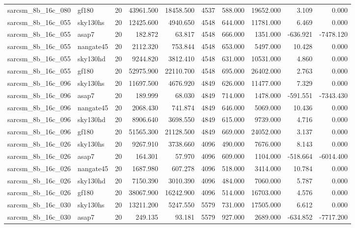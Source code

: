 \begin{tabular}{llrrrrrrrr}
sarcsm\_8b\_16c\_080 & gf180 & 20 & 43961.500 & 18458.500 & 4537 & 588.000 & 19652.000 & 3.109 & 0.000 \\
sarcsm\_8b\_16c\_055 & sky130hs & 20 & 12425.600 & 4940.650 & 4548 & 644.000 & 11781.000 & 6.469 & 0.000 \\
sarcsm\_8b\_16c\_055 & asap7 & 20 & 182.872 & 63.817 & 4548 & 666.000 & 1351.000 & -636.921 & -7478.120 \\
sarcsm\_8b\_16c\_055 & nangate45 & 20 & 2112.320 & 753.844 & 4548 & 653.000 & 5497.000 & 10.428 & 0.000 \\
sarcsm\_8b\_16c\_055 & sky130hd & 20 & 9244.820 & 3812.410 & 4548 & 631.000 & 10531.000 & 4.860 & 0.000 \\
sarcsm\_8b\_16c\_055 & gf180 & 20 & 52975.900 & 22110.700 & 4548 & 695.000 & 26402.000 & 2.763 & 0.000 \\
sarcsm\_8b\_16c\_096 & sky130hs & 20 & 11697.500 & 4676.920 & 4849 & 626.000 & 11477.000 & 7.329 & 0.000 \\
sarcsm\_8b\_16c\_096 & asap7 & 20 & 189.999 & 68.030 & 4849 & 714.000 & 1478.000 & -591.551 & -7343.430 \\
sarcsm\_8b\_16c\_096 & nangate45 & 20 & 2068.430 & 741.874 & 4849 & 646.000 & 5069.000 & 10.436 & 0.000 \\
sarcsm\_8b\_16c\_096 & sky130hd & 20 & 8906.640 & 3698.550 & 4849 & 615.000 & 9739.000 & 4.716 & 0.000 \\
sarcsm\_8b\_16c\_096 & gf180 & 20 & 51565.300 & 21128.500 & 4849 & 669.000 & 24052.000 & 3.137 & 0.000 \\
sarcsm\_8b\_16c\_026 & sky130hs & 20 & 9267.910 & 3738.660 & 4096 & 490.000 & 7676.000 & 8.143 & 0.000 \\
sarcsm\_8b\_16c\_026 & asap7 & 20 & 164.301 & 57.970 & 4096 & 609.000 & 1104.000 & -518.664 & -6014.400 \\
sarcsm\_8b\_16c\_026 & nangate45 & 20 & 1687.980 & 607.278 & 4096 & 518.000 & 3414.000 & 10.784 & 0.000 \\
sarcsm\_8b\_16c\_026 & sky130hd & 20 & 7150.390 & 3010.390 & 4096 & 484.000 & 7060.000 & 5.787 & 0.000 \\
sarcsm\_8b\_16c\_026 & gf180 & 20 & 38067.900 & 16242.900 & 4096 & 514.000 & 16703.000 & 4.576 & 0.000 \\
sarcsm\_8b\_16c\_030 & sky130hs & 20 & 13211.200 & 5247.550 & 5579 & 731.000 & 17505.000 & 6.612 & 0.000 \\
sarcsm\_8b\_16c\_030 & asap7 & 20 & 249.135 & 93.181 & 5579 & 927.000 & 2689.000 & -634.852 & -7717.200 \\

\end{tabular}
